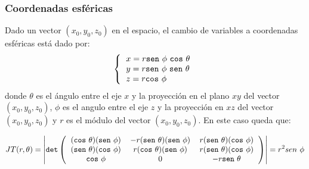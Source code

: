 \subsubsection{Coordenadas esféricas}
Dado un vector $(x_0,y_0,z_0)$ en el espacio, el cambio de variables a coordenadas esféricas está dado por:
\begin{align*}
\left\{
\begin{tabular}{l}
    $x = r\texttt{sen}~\phi~\texttt{cos}~\theta$ \\
    $y = r\texttt{sen}~\phi~\texttt{sen}~\theta$ \\
    $z = r\texttt{cos}~\phi$
\end{tabular}
\right.
\end{align*}
donde $\theta$ es el ángulo entre el eje $x$ y la proyección en el plano $xy$ del vector $(x_0,y_0,z_0)$, $\phi$ es el angulo entre el eje $z$ y la proyección en $xz$ del vector $(x_0,y_0,z_0)$ y $r$ es el módulo del vector $(x_0,y_0,z_0)$. En este caso queda que:

\begin{align*}
JT(r,\theta) = \left|\texttt{det}\left(
\begin{tabular}{c c c}
$(\texttt{cos}~\theta)(\texttt{sen}~\phi)$ & $-r(\texttt{sen}~\theta)(\texttt{sen}~\phi)$ & $r(\texttt{sen}~\theta)(\texttt{cos}~\phi)$\\
$(\texttt{sen}~\theta)(\texttt{cos}~\phi)$ & $r(\texttt{cos}~\theta)(\texttt{sen}~\phi)$ & $r(\texttt{sen}~\theta)(\texttt{cos}~\phi)$\\$\texttt{cos}~\phi$ & 0 & $-r\texttt{sen}~\theta$ \\
\end{tabular}
\right)\right| = r^2sen~\phi
\end{align*}


